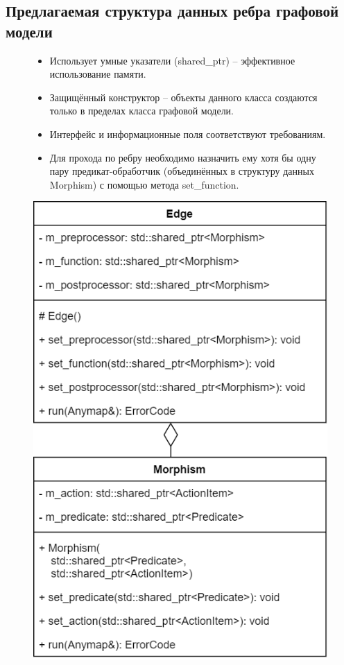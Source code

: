 \subsection{Предлагаемая структура данных ребра графовой модели}
\begin{frame}%
	\begin{figure}
		\begin{minipage}{0.49\textwidth}
			\begin{itemize}
				\item Использует умные указатели (\textsf{shared_ptr}) -- эффективное использование памяти.
				\item Защищённый конструктор -- объекты данного класса создаются только в пределах класса графовой модели.
				\item Интерфейс и информационные поля соответствуют требованиям.
				\item Для прохода по ребру необходимо назначить ему хотя бы одну пару предикат-обработчик (объединённых в структуру данных \textsf{Morphism}) с помощью метода set_function.
			\end{itemize}
		\end{minipage}\hfill\begin{minipage}{0.49\textwidth}
			\centering
			\includegraphics[height=0.75\textheight]{images/class.edge.png}

\end{minipage}
\end{figure}
\end{frame}

